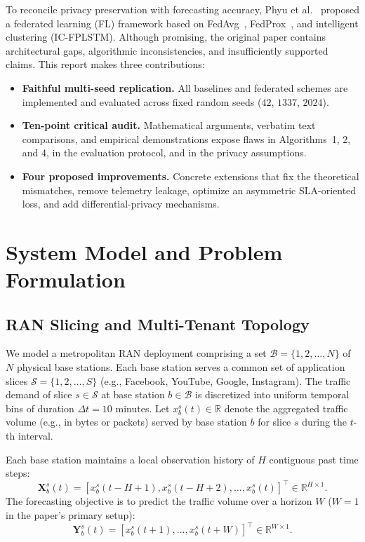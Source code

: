 \documentclass[11pt,a4paper]{article}
\begin{document}
To reconcile privacy preservation with forecasting accuracy, Phyu et al.~\cite{phyu2023multi} proposed a federated learning (FL) framework based on FedAvg~\cite{mcmahan2017communication}, FedProx~\cite{li2020federated}, and intelligent clustering (IC-FPLSTM). Although promising, the original paper contains architectural gaps, algorithmic inconsistencies, and insufficiently supported claims. This report makes three contributions:
\begin{itemize}
    \item \textbf{Faithful multi-seed replication.} All baselines and federated schemes are implemented and evaluated across fixed random seeds ($42$, $1337$, $2024$).
    \item \textbf{Ten-point critical audit.} Mathematical arguments, verbatim text comparisons, and empirical demonstrations expose flaws in Algorithms~1, 2, and 4, in the evaluation protocol, and in the privacy assumptions.
    \item \textbf{Four proposed improvements.} Concrete extensions that fix the theoretical mismatches, remove telemetry leakage, optimize an asymmetric SLA-oriented loss, and add differential-privacy mechanisms.
\end{itemize}

\section{System Model and Problem Formulation}

\subsection{RAN Slicing and Multi-Tenant Topology}
We model a metropolitan RAN deployment comprising a set $\mathcal{B} = \{1, 2, \dots, N\}$ of $N$ physical base stations. Each base station serves a common set of application slices $\mathcal{S} = \{1, 2, \dots, S\}$ (e.g., Facebook, YouTube, Google, Instagram). The traffic demand of slice $s \in \mathcal{S}$ at base station $b \in \mathcal{B}$ is discretized into uniform temporal bins of duration $\Delta t = 10$ minutes. Let $x_b^s(t) \in \mathbb{R}$ denote the aggregated traffic volume (e.g., in bytes or packets) served by base station $b$ for slice $s$ during the $t$-th interval.

Each base station maintains a local observation history of $H$ contiguous past time steps:
\begin{equation}
    \mathbf{X}_b^s(t) = \left[ x_b^s(t - H + 1), x_b^s(t - H + 2), \dots, x_b^s(t) \right]^{\top} \in \mathbb{R}^{H \times 1}.
\end{equation}
The forecasting objective is to predict the traffic volume over a horizon $W$ ($W=1$ in the paper's primary setup):
\begin{equation}
    \mathbf{Y}_b^s(t) = \left[ x_b^s(t + 1), \dots, x_b^s(t + W) \right]^{\top} \in \mathbb{R}^{W \times 1}.
\end{equation}
\end{document}
